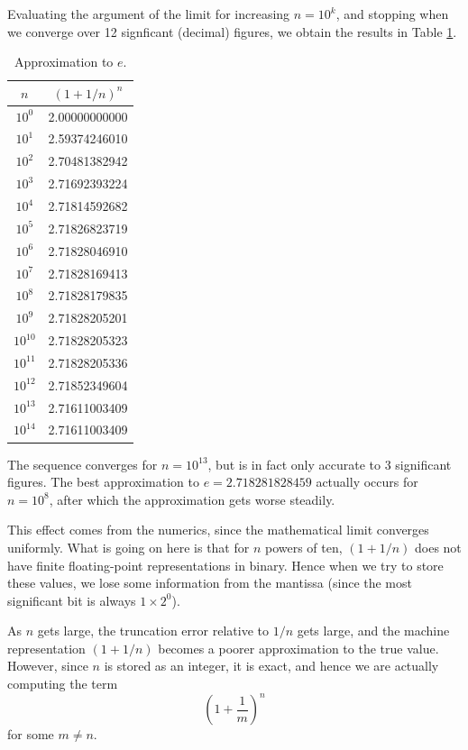 \documentclass[12pt]{article}
\begin{document}
Evaluating the argument of the limit for increasing $n = 10^k$, and stopping when we converge over 12 signficant (decimal) figures, we obtain the results in Table \ref{tab:e_approx}.

\begin{table}[h!]
\centering
\begin{tabular}{c|c}
$n$ 		& $\left(1 + 1/n\right)^n$ \\
\hline
$10^{0}$     & 2.00000000000   \\
$10^{1}$     & 2.59374246010   \\
$10^{2}$     & 2.70481382942   \\
$10^{3}$     & 2.71692393224   \\
$10^{4}$     & 2.71814592682   \\
$10^{5}$     & 2.71826823719   \\
$10^{6}$     & 2.71828046910   \\
$10^{7}$     & 2.71828169413   \\
$10^{8}$     & 2.71828179835   \\
$10^{9}$     & 2.71828205201   \\
$10^{10}$    & 2.71828205323   \\
$10^{11}$    & 2.71828205336   \\
$10^{12}$    & 2.71852349604   \\
$10^{13}$    & 2.71611003409   \\
$10^{14}$    & 2.71611003409   \\
\end{tabular}
\caption{Approximation to $e$. \label{tab:e_approx}}
\end{table}

The sequence converges for $n = 10^{13}$, but is in fact only accurate to 3 significant figures. The best approximation to $e = 2.718281828459$ actually occurs for $n = 10^8$, after which the approximation gets worse steadily.

This effect comes from the numerics, since the mathematical limit converges uniformly. What is going on here is that for $n$ powers of ten, $(1 + 1/n)$ does not have finite floating-point representations in binary. Hence when we try to store these values, we lose some information from the mantissa (since the most significant bit is always $1\times2^0$). 

As $n$ gets large, the truncation error relative to $1/n$ gets large, and the machine representation $(1 + 1/n)$ becomes a poorer approximation to the true value. However, since $n$ is stored as an integer, it is exact, and hence we are actually computing the term
\begin{equation*}
\left(1 + \frac{1}{m}\right)^n
\end{equation*}
for some $m \neq n$. 
\end{document}
